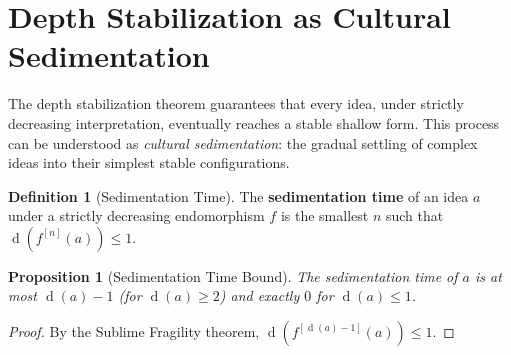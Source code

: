 \documentclass[11pt,openany]{book}
\theoremstyle{definition}
\newtheorem{definition}[axiom]{Definition}
\theoremstyle{plain}
\newtheorem{proposition}[axiom]{Proposition}
\theoremstyle{remark}
\newcommand{\depth}{\operatorname{d}}       %
\begin{document}
\section{Depth Stabilization as Cultural Sedimentation}

The depth stabilization theorem guarantees that every idea, under strictly decreasing interpretation, eventually reaches a stable shallow form. This process can be understood as \emph{cultural sedimentation}: the gradual settling of complex ideas into their simplest stable configurations.

\begin{definition}[Sedimentation Time]
The \textbf{sedimentation time} of an idea $a$ under a strictly decreasing endomorphism $f$ is the smallest $n$ such that $\depth(f^{[n]}(a)) \leq 1$.
\end{definition}

\begin{proposition}[Sedimentation Time Bound]
The sedimentation time of $a$ is at most $\depth(a) - 1$ (for $\depth(a) \geq 2$) and exactly $0$ for $\depth(a) \leq 1$.
\end{proposition}

\begin{proof}
By the Sublime Fragility theorem, $\depth(f^{[\depth(a)-1]}(a)) \leq 1$.
\end{proof}
\end{document}
